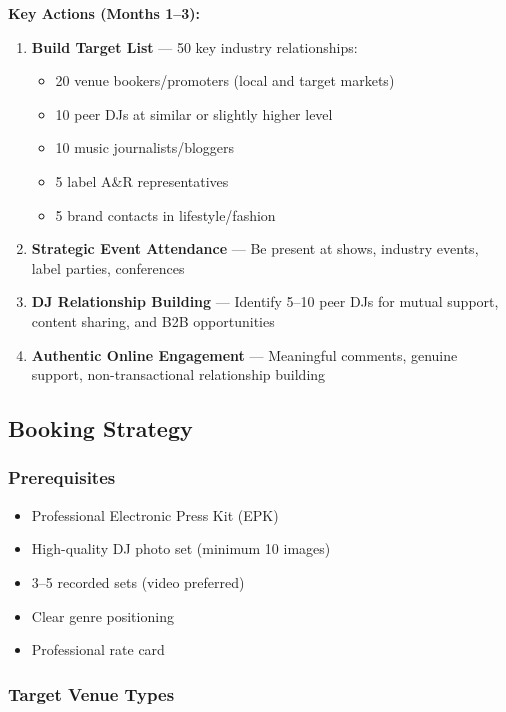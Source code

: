 \documentclass[11pt,a4paper]{article}
\begin{document}
\noindent\textbf{Key Actions (Months 1--3):}

\begin{enumerate}[leftmargin=*]
    \item \textbf{Build Target List} --- 50 key industry relationships:
    \begin{itemize}
        \item 20 venue bookers/promoters (local and target markets)
        \item 10 peer DJs at similar or slightly higher level
        \item 10 music journalists/bloggers
        \item 5 label A\&R representatives
        \item 5 brand contacts in lifestyle/fashion
    \end{itemize}
    
    \item \textbf{Strategic Event Attendance} --- Be present at shows, industry events, label parties, conferences
    
    \item \textbf{DJ Relationship Building} --- Identify 5--10 peer DJs for mutual support, content sharing, and B2B opportunities
    
    \item \textbf{Authentic Online Engagement} --- Meaningful comments, genuine support, non-transactional relationship building
\end{enumerate}

\subsection{Booking Strategy}

\subsubsection{Prerequisites}
\begin{itemize}[leftmargin=*]
    \item Professional Electronic Press Kit (EPK)
    \item High-quality DJ photo set (minimum 10 images)
    \item 3--5 recorded sets (video preferred)
    \item Clear genre positioning
    \item Professional rate card
\end{itemize}

\subsubsection{Target Venue Types}
\end{document}
